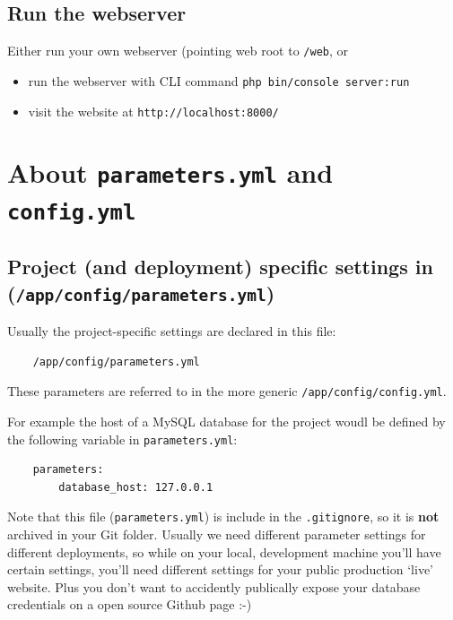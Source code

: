 \documentclass[a4paperpaper,openright]{book}
\providecommand{\tightlist}{%
  \setlength{\itemsep}{0pt}\setlength{\parskip}{0pt}}
\begin{document}
\hypertarget{run-the-webserver}{%
\section{Run the webserver}\label{run-the-webserver}}

Either run your own webserver (pointing web root to \texttt{/web}, or

\begin{itemize}
\tightlist
\item
  run the webserver with CLI command
  \texttt{php\ bin/console\ server:run}
\item
  visit the website at \texttt{http://localhost:8000/}
\end{itemize}

\hypertarget{about-parameters.yml-and-config.yml}{%
\chapter{\texorpdfstring{About \texttt{parameters.yml} and
\texttt{config.yml}
\label{appendix_parameters}}{About parameters.yml and config.yml }}\label{about-parameters.yml-and-config.yml}}

\hypertarget{project-and-deployment-specific-settings-in-appconfigparameters.yml}{%
\section{\texorpdfstring{Project (and deployment) specific settings in
(\texttt{/app/config/parameters.yml})}{Project (and deployment) specific settings in (/app/config/parameters.yml)}}\label{project-and-deployment-specific-settings-in-appconfigparameters.yml}}

Usually the project-specific settings are declared in this file:

\begin{verbatim}
    /app/config/parameters.yml
\end{verbatim}

These parameters are referred to in the more generic
\texttt{/app/config/config.yml}.

For example the host of a MySQL database for the project woudl be
defined by the following variable in \texttt{parameters.yml}:

\begin{verbatim}
    parameters:
        database_host: 127.0.0.1
\end{verbatim}

Note that this file (\texttt{parameters.yml}) is include in the
\texttt{.gitignore}, so it is \textbf{not} archived in your Git folder.
Usually we need different parameter settings for different deployments,
so while on your local, development machine you'll have certain
settings, you'll need different settings for your public production
`live' website. Plus you don't want to accidently publically expose your
database credentials on a open source Github page :-)
\end{document}
